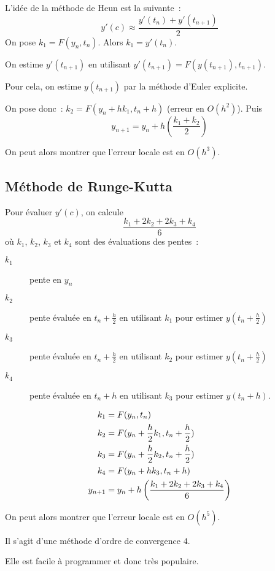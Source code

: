 L'idée de la méthode de Heun est la suivante~:
\begin{equation*}
  y'(c)\approx \frac{y'(t_{n})+y'(t_{n+1})}{2}
\end{equation*}
On pose $\boxed{k_{1} = F(y_{n},t_{n})}$.
Alors $k_{1} = y'(t_{n})$.

On estime $y'(t_{n+1})$ en utilisant $y'(t_{n+1}) = F(y(t_{n+1}),
t_{n+1})$.

Pour cela, on estime $y(t_{n+1})$ par la méthode d'Euler
explicite.

On pose donc~: $\boxed{k_{2} = F(y_{n}+hk_{1},t_{n}+h)}$ (erreur en $O(h^{2})$).
Puis
\begin{equation*}
  \boxed{y_{n+1} = y_{n} + h
\left(
  \frac{k_{1}+k_{2}}{2}
\right)}
\end{equation*}


On peut alors montrer que l'erreur locale est en $O(h^{3})$.


\subsection*{Méthode de Runge-Kutta}

Pour évaluer $y'(c)$, on calcule
\begin{equation*}
  \frac{k_{1} + 2 k_{2} + 2 k_{3} + k_{4}}{6}
\end{equation*}
où $k_{1}$, $k_{2}$, $k_{3}$ et $k_{4}$ sont des évaluations des
pentes~:
\begin{description}
\item[$k_{1}$] pente en $y_{n}$
\item[$k_2$] pente évaluée en $t_{n}+\frac{h}{2}$ en utilisant $k_{1}$
  pour estimer $y(t_{n}+\frac{h}{2})$
\item[$k_3$] pente évaluée en $t_{n}+\frac{h}{2}$ en utilisant $k_{2}$
  pour estimer $y(t_{n}+\frac{h}{2})$
\item[$k_4$] pente évaluée en $t_{n}+h$ en utilisant $k_{3}$ pour
  estimer $y(t_{n}+h)$.
\end{description}
\begin{align*}
  k_{1} &= F(y_{n}, t_{n})\\
  k_{2} &= F(y_{n} + \frac{h}{2}k_{1},t_{n} + \frac{h}{2})\\
  k_{3} &= F(y_{n} + \frac{h}{2}k_{2},t_{n}+ \frac{h}{2})\\
  k_{4} &= F(y_{n}+h k_{3},t_{n}+h)\\
  y_{n+1} &= y_{n} +h \left( \frac{k_{1}+2k_{2}+2k_{3}+k_{4}}{6}\right)
\end{align*}

On peut alors montrer que l'erreur locale est en $O(h^{5})$.

Il s'agit d'une méthode d'ordre de convergence $4$.

Elle est facile à programmer et donc très populaire.

%
%
%
%  
